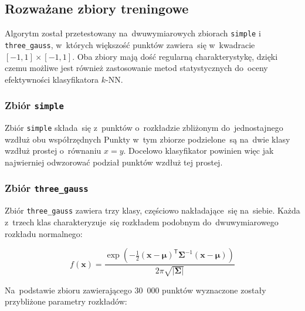 \documentclass[11pt,a4paper]{article}
\begin{document}
\subsection{Rozważane zbiory treningowe}

Algorytm został przetestowany na~dwuwymiarowych zbiorach {\tt simple} i {\tt three\_gauss}, w~których większość punktów zawiera~się w~kwadracie $[-1,1] \times [-1,1]$.
Oba zbiory mają dość regularną charakterystykę, dzięki czemu możliwe jest również zastosowanie metod statystycznych do~oceny efektywności klasyfikatora $k$-NN.

\subsubsection{Zbiór {\tt simple}}

Zbiór {\tt simple} składa~się z~punktów o~rozkładzie zbliżonym do~jednostajnego wzdłuż obu współrzędnych
Punkty w~tym zbiorze podzielone~są na~dwie klasy wzdłuż prostej o~równaniu $x=y$.
Docelowo klasyfikator powinien więc jak najwierniej odwzorować podział punktów wzdłuż tej prostej.

\subsubsection{Zbiór {\tt three\_gauss}}

Zbiór {\tt three\_gauss} zawiera trzy klasy, częściowo nakładające~się na~siebie.
Każda z~trzech klas charakteryzuje~się rozkładem podobnym do~dwuwymiarowego rozkładu normalnego:

$$ f(\mathbf{x}) = \frac{\exp \left( -\frac{1}{2} (\mathbf{x} - \boldsymbol\mu)^\mathsf{T} \boldsymbol\Sigma^{-1} (\mathbf{x} - \boldsymbol\mu) \right)}{2\pi \sqrt{|\boldsymbol\Sigma|}} $$

Na~podstawie zbioru zawierającego 30~000 punktów wyznaczone zostały przybliżone parametry rozkładów:
\end{document}
